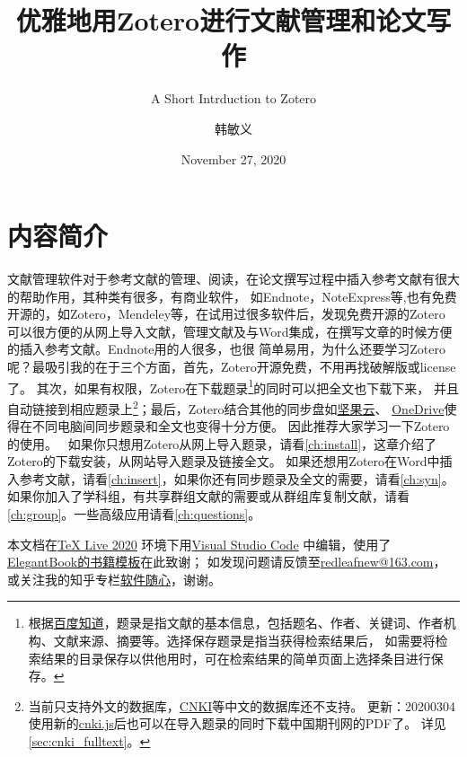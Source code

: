 \documentclass[cn,11pt,chinese]{elegantbook}
\title{优雅地用Zotero进行文献管理和论文写作}
\subtitle{A Short Intrduction to Zotero}
\author{韩敏义}
\institute{南京农业大学\\\kaishu\hspace{1.1cm}温氏食品集团股份有限公司}
\date{November 27, 2020}
\begin{document}
 
\maketitle
\frontmatter

  \chapter*{内容简介}
	
		文献管理软件对于参考文献的管理、阅读，在论文撰写过程中插入参考文献有很大的帮助作用，其种类有很多，有商业软件，
		如Endnote，NoteExpress等,也有免费开源的，如Zotero，Mendeley等，在试用过很多软件后，发现免费开源的Zotero
		可以很方便的从网上导入文献，管理文献及与Word集成，在撰写文章的时候方便的插入参考文献。Endnote用的人很多，也很
		简单易用，为什么还要学习Zotero呢？最吸引我的在于三个方面，首先，Zotero开源免费，不用再找破解版或license了。
		其次，如果有权限，Zotero在下载题录\footnote{根据\href{https://zhidao.baidu.com/question/443193991.html}
		{百度知道}，题录是指文献的基本信息，包括题名、作者、关键词、作者机构、文献来源、摘要等。选择保存题录是指当获得检索结果后，
		如需要将检索结果的目录保存以供他用时，可在检索结果的简单页面上选择条目进行保存。}的同时可以把全文也下载下来，
		并且自动链接到相应题录上\footnote{当前只支持外文的数据库，\href{http://www.cnki.net}{CNKI}等中文的数据库还不支持。
		更新：20200304 使用新的\href{https://github.com/Zotero-CN/translators_CN}{cnki.js}后也可以在导入题录的同时下载中国期刊网的PDF了。
		详见\cref{sec:cnki_fulltext}。}；最后，Zotero结合其他的同步盘如\href{https://www.jianguoyun.com}{坚果云}、
		\href{https://office.live.com/start/OneDrive.aspx}{OneDrive}使得在不同电脑间同步题录和全文也变得十分方便。
		因此推荐大家学习一下Zotero的使用。
		\
		如果你只想用Zotero从网上导入题录，请看\cref{ch:install}，这章介绍了Zotero的下载安装，从网站导入题录及链接全文。
		如果还想用Zotero在Word中插入参考文献，请看\cref{ch:insert}，如果你还有同步题录及全文的需要，请看\cref{ch:syn}。
		如果你加入了学科组，有共享群组文献的需要或从群组库复制文献，请看\cref{ch:group}。一些高级应用请看\cref{ch:questions}。
		
		
		本文档在\href{http://tug.org/texlive/}{\TeX{} Live 2020} 环境下用\href{https://code.visualstudio.com/}{Visual Studio Code}
		中编辑，使用了\href{https://elegantlatex.org/}{ElegantBook的书籍模板}在此致谢；
		如发现问题请反馈至\href{mailto:redleafnew@163.com}{redleafnew@163.com}，
		或关注我的知乎专栏\href{https://zhuanlan.zhihu.com/c_1071081428967743488}{软件随心}，谢谢。

\tableofcontents
\end{document}
